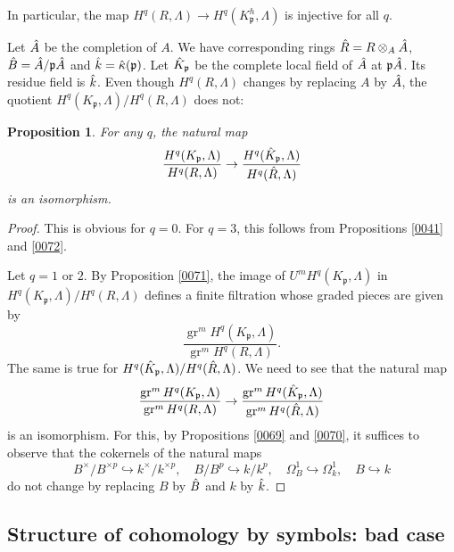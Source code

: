 \documentclass{amsart}
\newtheorem{Prop}[Thm]{Proposition}
\theoremstyle{remark}
\numberwithin{equation}{subsection}
\newcommand{\into}{\hookrightarrow}
\newcommand{\tensor}{\mathbin{\otimes}}
\newcommand{\ideal}[1]{\mathfrak{#1}}
\DeclareMathOperator{\gr}{gr}
\begin{document}
In particular, the map
$H^{q}(R, \Lambda) \to H^{q}(K_{\ideal{p}}^{h}, \Lambda)$ is injective for all $q$.

Let $\Hat{A}$ be the completion of $A$.
We have corresponding rings $\Hat{R} = R \tensor_{A} \Hat{A}$,
 $\Hat{B} = \Hat{A} / \ideal{p} \Hat{A}$ and
$\Hat{k} = \Hat{\kappa}(\ideal{p})$.
Let $\Hat{K}_{\ideal{p}}$ be the complete local field of $\Hat{A}$ at $\ideal{p} \Hat{A}$.
Its residue field is $\Hat{k}$.
Even though $H^{q}(R, \Lambda)$ changes by replacing $A$ by $\Hat{A}$,
the quotient $H^{q}(K_{\ideal{p}}, \Lambda) / H^{q}(R, \Lambda)$ does not:

\begin{Prop} \label{0073}
	For any $q$, the natural map
		\[
				\frac{
					H^{q}(K_{\ideal{p}}, \Lambda)
				}{
					H^{q}(R, \Lambda)
				}
			\to
				\frac{
					H^{q}(\Hat{K}_{\ideal{p}}, \Lambda)
				}{
					H^{q}(\Hat{R}, \Lambda)
				}
		\]
	is an isomorphism.
\end{Prop}

\begin{proof}
	This is obvious for $q = 0$.
	For $q = 3$, this follows from
	Propositions \ref{0041}
	and \ref{0072}.
	
	Let $q = 1$ or $2$.
	By Proposition \ref{0071},
	the image of $U^{m} H^{q}(K_{\ideal{p}}, \Lambda)$
	in $H^{q}(K_{\ideal{p}}, \Lambda) / H^{q}(R, \Lambda)$ defines a finite filtration
	whose graded pieces are given by
		\[
			\frac{
				\gr^{m} H^{q}(K_{\ideal{p}}, \Lambda)
			}{
				\gr^{m} H^{q}(R, \Lambda)
			}.
		\]
	The same is true for
	$H^{q}(\Hat{K}_{\ideal{p}}, \Lambda) / H^{q}(\Hat{R}, \Lambda)$.
	We need to see that the natural map
		\[
				\frac{
					\gr^{m} H^{q}(K_{\ideal{p}}, \Lambda)
				}{
					\gr^{m} H^{q}(R, \Lambda)
				}
			\to
				\frac{
					\gr^{m} H^{q}(\Hat{K}_{\ideal{p}}, \Lambda)
				}{
					\gr^{m} H^{q}(\Hat{R}, \Lambda)
				}
		\]
	is an isomorphism.
	For this, by Propositions \ref{0069} and \ref{0070},
	it suffices to observe that the cokernels of the natural maps
		\[
				B^{\times} / B^{\times p} \into k^{\times} / k^{\times p},
			\quad
				B / B^{p} \into k / k^{p},
			\quad
				\Omega_{B}^{1} \into \Omega_{k}^{1},
			\quad
				B \into k
		\]
	do not change by replacing $B$ by $\Hat{B}$ and $k$ by $\Hat{k}$.
\end{proof}


\subsection{Structure of cohomology by symbols: bad case}
\label{0074}
\end{document}
